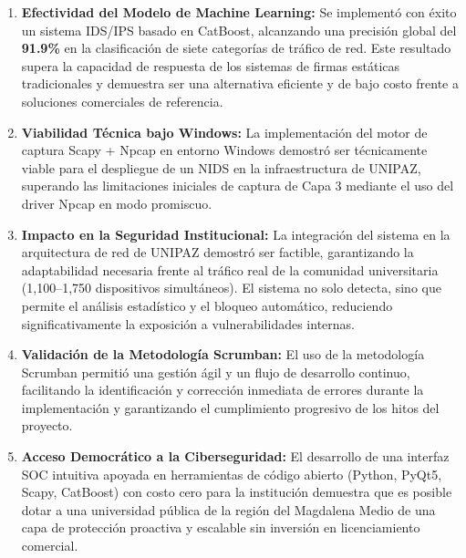 \documentclass[12pt, letterpaper, oneside]{report}
\begin{document}
\begin{enumerate}[leftmargin=*, label=\textbf{\arabic*.}]

  \item \textbf{Efectividad del Modelo de Machine Learning:} Se implementó con éxito un sistema IDS/IPS basado en CatBoost, alcanzando una precisión global del \textbf{91.9\%} en la clasificación de siete categorías de tráfico de red. Este resultado supera la capacidad de respuesta de los sistemas de firmas estáticas tradicionales y demuestra ser una alternativa eficiente y de bajo costo frente a soluciones comerciales de referencia.

  \item \textbf{Viabilidad Técnica bajo Windows:} La implementación del motor de captura Scapy + Npcap en entorno Windows demostró ser técnicamente viable para el despliegue de un NIDS en la infraestructura de UNIPAZ, superando las limitaciones iniciales de captura de Capa 3 mediante el uso del driver Npcap en modo promiscuo.

  \item \textbf{Impacto en la Seguridad Institucional:} La integración del sistema en la arquitectura de red de UNIPAZ demostró ser factible, garantizando la adaptabilidad necesaria frente al tráfico real de la comunidad universitaria (1,100--1,750 dispositivos simultáneos). El sistema no solo detecta, sino que permite el análisis estadístico y el bloqueo automático, reduciendo significativamente la exposición a vulnerabilidades internas.

  \item \textbf{Validación de la Metodología Scrumban:} El uso de la metodología Scrumban permitió una gestión ágil y un flujo de desarrollo continuo, facilitando la identificación y corrección inmediata de errores durante la implementación y garantizando el cumplimiento progresivo de los hitos del proyecto.

  \item \textbf{Acceso Democrático a la Ciberseguridad:} El desarrollo de una interfaz SOC intuitiva apoyada en herramientas de código abierto (Python, PyQt5, Scapy, CatBoost) con costo cero para la institución demuestra que es posible dotar a una universidad pública de la región del Magdalena Medio de una capa de protección proactiva y escalable sin inversión en licenciamiento comercial.

\end{enumerate}

\end{document}

